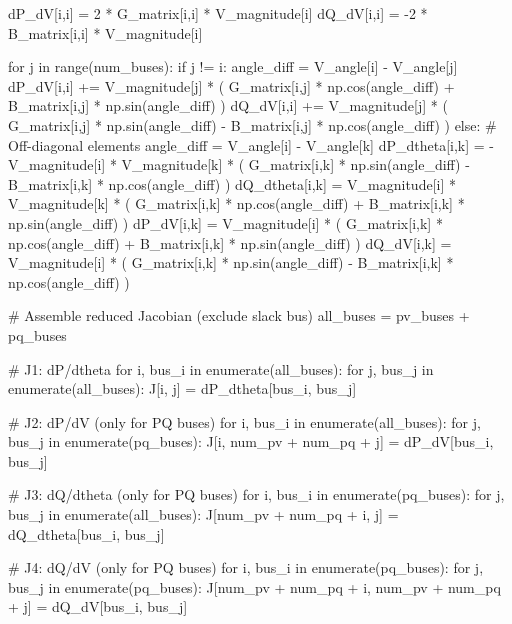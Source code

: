 \documentclass[11pt,a4paper]{article}
\begin{document}
\begin{pycode}
                dP_dV[i,i] = 2 * G_matrix[i,i] * V_magnitude[i]
                dQ_dV[i,i] = -2 * B_matrix[i,i] * V_magnitude[i]

                for j in range(num_buses):
                    if j != i:
                        angle_diff = V_angle[i] - V_angle[j]
                        dP_dV[i,i] += V_magnitude[j] * (
                            G_matrix[i,j] * np.cos(angle_diff) +
                            B_matrix[i,j] * np.sin(angle_diff)
                        )
                        dQ_dV[i,i] += V_magnitude[j] * (
                            G_matrix[i,j] * np.sin(angle_diff) -
                            B_matrix[i,j] * np.cos(angle_diff)
                        )
            else:
                # Off-diagonal elements
                angle_diff = V_angle[i] - V_angle[k]
                dP_dtheta[i,k] = -V_magnitude[i] * V_magnitude[k] * (
                    G_matrix[i,k] * np.sin(angle_diff) -
                    B_matrix[i,k] * np.cos(angle_diff)
                )
                dQ_dtheta[i,k] = V_magnitude[i] * V_magnitude[k] * (
                    G_matrix[i,k] * np.cos(angle_diff) +
                    B_matrix[i,k] * np.sin(angle_diff)
                )
                dP_dV[i,k] = V_magnitude[i] * (
                    G_matrix[i,k] * np.cos(angle_diff) +
                    B_matrix[i,k] * np.sin(angle_diff)
                )
                dQ_dV[i,k] = V_magnitude[i] * (
                    G_matrix[i,k] * np.sin(angle_diff) -
                    B_matrix[i,k] * np.cos(angle_diff)
                )

    # Assemble reduced Jacobian (exclude slack bus)
    all_buses = pv_buses + pq_buses

    # J1: dP/dtheta
    for i, bus_i in enumerate(all_buses):
        for j, bus_j in enumerate(all_buses):
            J[i, j] = dP_dtheta[bus_i, bus_j]

    # J2: dP/dV (only for PQ buses)
    for i, bus_i in enumerate(all_buses):
        for j, bus_j in enumerate(pq_buses):
            J[i, num_pv + num_pq + j] = dP_dV[bus_i, bus_j]

    # J3: dQ/dtheta (only for PQ buses)
    for i, bus_i in enumerate(pq_buses):
        for j, bus_j in enumerate(all_buses):
            J[num_pv + num_pq + i, j] = dQ_dtheta[bus_i, bus_j]

    # J4: dQ/dV (only for PQ buses)
    for i, bus_i in enumerate(pq_buses):
        for j, bus_j in enumerate(pq_buses):
            J[num_pv + num_pq + i, num_pv + num_pq + j] = dQ_dV[bus_i, bus_j]


\end{pycode}
\end{document}
